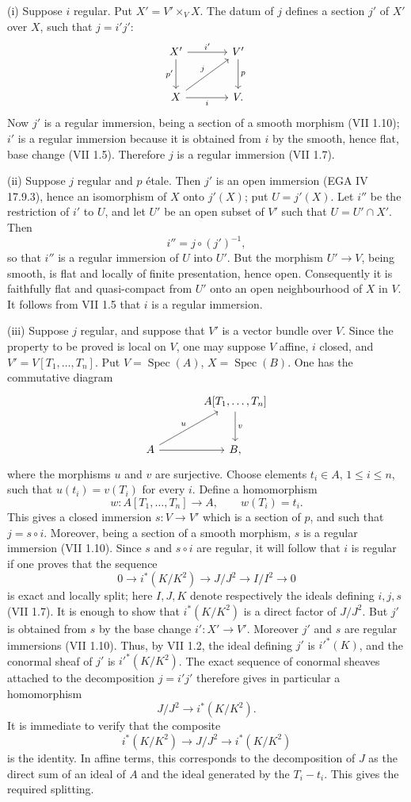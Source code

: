 \documentclass[11pt]{article}
\newcommand{\Spec}{\operatorname{Spec}}
\providecommand{\etale}{\'etale}
\begin{document}
(i) Suppose $i$ regular. Put $X'=V'\times_V X$. The datum of $j$ defines a section $j'$ of $X'$ over $X$, such that $j=i'j'$:
\[
\begin{tikzcd}[column sep=large,row sep=large]
X' \arrow[r,"i'"] \arrow[d,"p'"'] & V' \arrow[d,"p"]\\
X \arrow[r,"i"'] \arrow[ur,"j"] & V .
\end{tikzcd}
\]
Now $j'$ is a regular immersion, being a section of a smooth morphism (VII 1.10); $i'$ is a regular immersion because it is obtained from $i$ by the smooth, hence flat, base change (VII 1.5). Therefore $j$ is a regular immersion (VII 1.7).

(ii) Suppose $j$ regular and $p$ \etale. Then $j'$ is an open immersion (EGA IV 17.9.3), hence an isomorphism of $X$ onto $j'(X)$; put $U=j'(X)$. Let $i''$ be the restriction of $i'$ to $U$, and let $U'$ be an open subset of $V'$ such that $U=U'\cap X'$. Then
\[
i''=j\circ(j')^{-1},
\]
so that $i''$ is a regular immersion of $U$ into $U'$. But the morphism $U'\to V$, being smooth, is flat and locally of finite presentation, hence open. Consequently it is faithfully flat and quasi-compact from $U'$ onto an open neighbourhood of $X$ in $V$. It follows from VII 1.5 that $i$ is a regular immersion.

(iii) Suppose $j$ regular, and suppose that $V'$ is a vector bundle over $V$. Since the property to be proved is local on $V$, one may suppose $V$ affine, $i$ closed, and $V'=V[T_1,\ldots,T_n]$. Put $V=\Spec(A)$, $X=\Spec(B)$. One has the commutative diagram
\[
\begin{tikzcd}[column sep=large,row sep=large]
& A[T_1,\ldots,T_n] \arrow[d,"v"]\\
A \arrow[r] \arrow[ur,"u"] & B,
\end{tikzcd}
\]
where the morphisms $u$ and $v$ are surjective. Choose elements $t_i\in A$, $1\leq i\leq n$, such that $u(t_i)=v(T_i)$ for every $i$. Define a homomorphism
\[
w:A[T_1,\ldots,T_n]\longrightarrow A,
\qquad w(T_i)=t_i.
\]
This gives a closed immersion $s:V\to V'$ which is a section of $p$, and such that $j=s\circ i$. Moreover, being a section of a smooth morphism, $s$ is a regular immersion (VII 1.10). Since $s$ and $s\circ i$ are regular, it will follow that $i$ is regular if one proves that the sequence
\[
0\longrightarrow i^*(K/K^2)\longrightarrow J/J^2\longrightarrow I/I^2\longrightarrow 0
\]
is exact and locally split; here $I,J,K$ denote respectively the ideals defining $i,j,s$ (VII 1.7). It is enough to show that $i^*(K/K^2)$ is a direct factor of $J/J^2$. But $j'$ is obtained from $s$ by the base change $i':X'\to V'$. Moreover $j'$ and $s$ are regular immersions (VII 1.10). Thus, by VII 1.2, the ideal defining $j'$ is $i'^*(K)$, and the conormal sheaf of $j'$ is $i'^*(K/K^2)$. The exact sequence of conormal sheaves attached to the decomposition $j=i'j'$ therefore gives in particular a homomorphism
\[
J/J^2\longrightarrow i^*(K/K^2).
\]
It is immediate to verify that the composite
\[
i^*(K/K^2)\longrightarrow J/J^2\longrightarrow i^*(K/K^2)
\]
is the identity. In affine terms, this corresponds to the decomposition of $J$ as the direct sum of an ideal of $A$ and the ideal generated by the $T_i-t_i$. This gives the required splitting.
\end{document}
